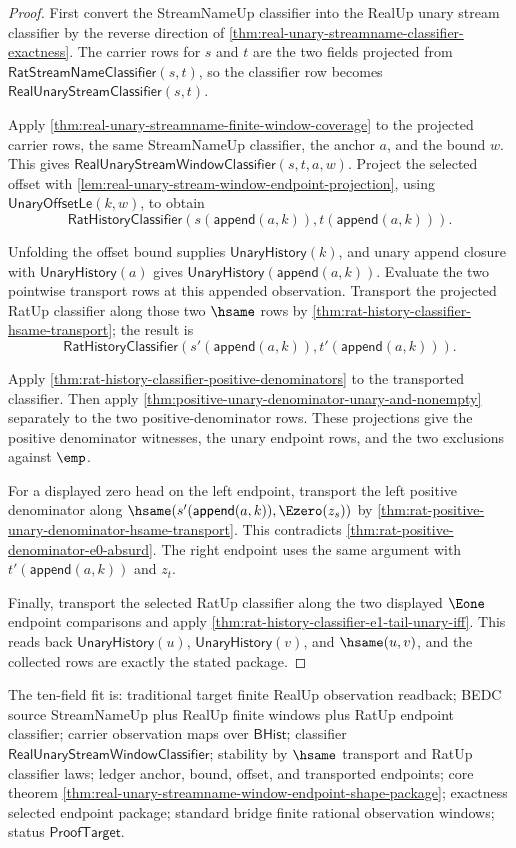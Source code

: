 \begin{proof}
First convert the StreamNameUp classifier into the RealUp unary stream
classifier by the reverse direction of
\autoref{thm:real-unary-streamname-classifier-exactness}. The carrier rows for
$s$ and $t$ are the two fields projected from
$\mathsf{RatStreamNameClassifier}(s,t)$, so the classifier row becomes
$\mathsf{RealUnaryStreamClassifier}(s,t)$.

Apply \autoref{thm:real-unary-streamname-finite-window-coverage} to the
projected carrier rows, the same StreamNameUp classifier, the anchor $a$, and
the bound $w$. This gives
$\mathsf{RealUnaryStreamWindowClassifier}(s,t,a,w)$. Project the selected
offset with \autoref{lem:real-unary-stream-window-endpoint-projection}, using
$\mathsf{UnaryOffsetLe}(k,w)$, to obtain
$$
\mathsf{RatHistoryClassifier}
(s(\mathsf{append}(a,k)),t(\mathsf{append}(a,k))).
$$

Unfolding the offset bound supplies $\mathsf{UnaryHistory}(k)$, and unary append
closure with $\mathsf{UnaryHistory}(a)$ gives
$\mathsf{UnaryHistory}(\mathsf{append}(a,k))$. Evaluate the two pointwise
transport rows at this appended observation. Transport the projected RatUp
classifier along those two $\hsame$ rows by
\autoref{thm:rat-history-classifier-hsame-transport}; the result is
$$
\mathsf{RatHistoryClassifier}
(s'(\mathsf{append}(a,k)),t'(\mathsf{append}(a,k))).
$$

Apply \autoref{thm:rat-history-classifier-positive-denominators} to the
transported classifier. Then apply
\autoref{thm:positive-unary-denominator-unary-and-nonempty} separately to the
two positive-denominator rows. These projections give the positive denominator
witnesses, the unary endpoint rows, and the two exclusions against $\emp$.

For a displayed zero head on the left endpoint, transport the left positive
denominator along
$\hsame(s'(\mathsf{append}(a,k)),\Ezero(z_s))$ by
\autoref{thm:rat-positive-unary-denominator-hsame-transport}. This contradicts
\autoref{thm:rat-positive-denominator-e0-absurd}. The right endpoint uses the
same argument with $t'(\mathsf{append}(a,k))$ and $z_t$.

Finally, transport the selected RatUp classifier along the two displayed
$\Eone$ endpoint comparisons and apply
\autoref{thm:rat-history-classifier-e1-tail-unary-iff}. This reads back
$\mathsf{UnaryHistory}(u)$, $\mathsf{UnaryHistory}(v)$, and $\hsame(u,v)$, and
the collected rows are exactly the stated package.
\end{proof}

The ten-field fit is: traditional target finite RealUp observation readback;
BEDC source StreamNameUp plus RealUp finite windows plus RatUp endpoint
classifier; carrier observation maps over $\mathsf{BHist}$; classifier
$\mathsf{RealUnaryStreamWindowClassifier}$; stability by $\hsame$ transport and
RatUp classifier laws; ledger anchor, bound, offset, and transported endpoints;
core theorem
\autoref{thm:real-unary-streamname-window-endpoint-shape-package}; exactness
selected endpoint package; standard bridge finite rational observation windows;
status $\mathsf{ProofTarget}$.
